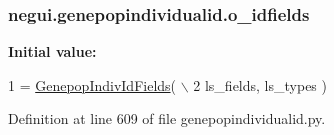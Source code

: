 \subsubsection[{\texorpdfstring{o\+\_\+idfields}{o_idfields}}]{\setlength{\rightskip}{0pt plus 5cm}negui.\+genepopindividualid.\+o\+\_\+idfields}\hypertarget{namespacenegui_1_1genepopindividualid_ab7f1c836cd2dbd7fb2a0e62b6724aca0}{}\label{namespacenegui_1_1genepopindividualid_ab7f1c836cd2dbd7fb2a0e62b6724aca0}
{\bfseries Initial value\+:}
\begin{DoxyCode}
1 = \hyperlink{classnegui_1_1genepopindividualid_1_1GenepopIndivIdFields}{GenepopIndivIdFields}( \(\backslash\)
2             ls\_fields, ls\_types )
\end{DoxyCode}


Definition at line 609 of file genepopindividualid.\+py.

